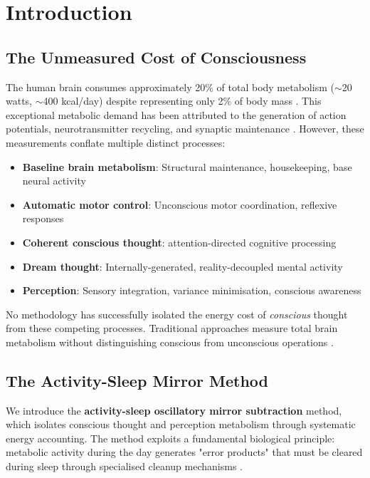 \documentclass[12pt]{article}
\theoremstyle{remark}
\begin{document}
\section{Introduction}

\subsection{The Unmeasured Cost of Consciousness}

The human brain consumes approximately 20\% of total body metabolism ($\sim$20 watts, $\sim$400 kcal/day) despite representing only 2\% of body mass \citep{raichle2002appraising,clarke2008cerebral}. This exceptional metabolic demand has been attributed to the generation of action potentials, neurotransmitter recycling, and synaptic maintenance \citep{attwell2001energy}. However, these measurements conflate multiple distinct processes:

\begin{itemize}
\item \textbf{Baseline brain metabolism}: Structural maintenance, housekeeping, base neural activity
\item \textbf{Automatic motor control}: Unconscious motor coordination, reflexive responses
\item \textbf{Coherent conscious thought}: attention-directed cognitive processing
\item \textbf{Dream thought}: Internally-generated, reality-decoupled mental activity
\item \textbf{Perception}: Sensory integration, variance minimisation, conscious awareness
\end{itemize}

No methodology has successfully isolated the energy cost of \textit{conscious} thought from these competing processes. Traditional approaches measure total brain metabolism without distinguishing conscious from unconscious operations \citep{shulman2004energetic,magistretti2006cellular}.

\subsection{The Activity-Sleep Mirror Method}

We introduce the \textbf{activity-sleep oscillatory mirror subtraction} method, which isolates conscious thought and perception metabolism through systematic energy accounting. The method exploits a fundamental biological principle: metabolic activity during the day generates "error products" that must be cleared during sleep through specialised cleanup mechanisms \citep{xie2013sleep,nedergaard2013garbage}.
\end{document}
